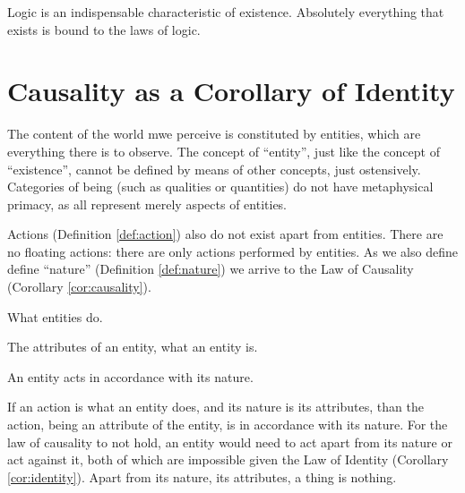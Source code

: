         Logic is an indispensable characteristic of existence. Absolutely everything that exists is bound to the laws of logic.
            
    \section{Causality as a Corollary of Identity}
        
        The content of the world mwe perceive is constituted by entities, which are everything there is to observe. The concept of ``entity'', just like the concept of ``existence'', cannot be defined by means of other concepts, just ostensively. Categories of being (such as qualities or quantities) do not have metaphysical primacy, as all represent merely aspects of entities.

        Actions (Definition \ref{def:action}) also do not exist apart from entities. There are no floating actions: there are only actions performed by entities. As we also define define ``nature'' (Definition \ref{def:nature}) we arrive to the Law of Causality (Corollary \ref{cor:causality}).
        
            \begin{definition}[Action]
            \label{def:action}
                What entities do.
            \end{definition}
            
            \begin{definition}[Nature]
            \label{def:nature}
                The attributes of an entity, what an entity is.
            \end{definition}
        
            \begin{corollary}
            \label{cor:causality}
                An entity acts in accordance with its nature.
            \end{corollary}

            \begin{remark}
                If an action is what an entity does, and its nature is its attributes, than the action, being an attribute of the entity, is in accordance with its nature. For the law of causality to not hold, an entity would need to act apart from its nature or act against it, both of which are impossible given the Law of Identity (Corollary \ref{cor:identity}). Apart from its nature, its attributes, a thing is nothing.
            \end{remark}
            
